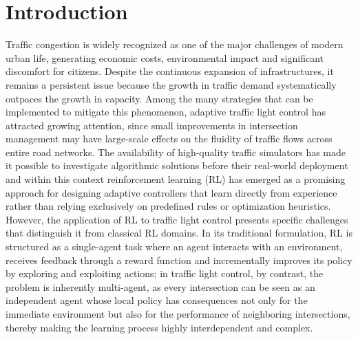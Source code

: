 \chapter{Introduction}
\label{chapter:introduction}

Traffic congestion is widely recognized as one of the major challenges of modern urban life, generating economic costs, environmental impact and significant discomfort for citizens.
Despite the continuous expansion of infrastructures, it remains a persistent issue because the growth in traffic demand systematically outpaces the growth in capacity.
Among the many strategies that can be implemented to mitigate this phenomenon, adaptive traffic light control has attracted growing attention, since small improvements in intersection management may have large-scale effects on the fluidity of traffic flows across entire road networks.
The availability of high-quality traffic simulators has made it possible to investigate algorithmic solutions before their real-world deployment and within this context reinforcement learning (RL) has emerged as a promising approach for designing adaptive controllers that learn directly from experience rather than relying exclusively on predefined rules or optimization heuristics.
However, the application of RL to traffic light control presents specific challenges that distinguish it from classical RL domains.
In its traditional formulation, RL is structured as a single-agent task where an agent interacts with an environment, receives feedback through a reward function and incrementally improves its policy by exploring and exploiting actions; in traffic light control, by contrast, the problem is inherently multi-agent, as every intersection can be seen as an independent agent whose local policy has consequences not only for the immediate environment but also for the performance of neighboring intersections, thereby making the learning process highly interdependent and complex.

